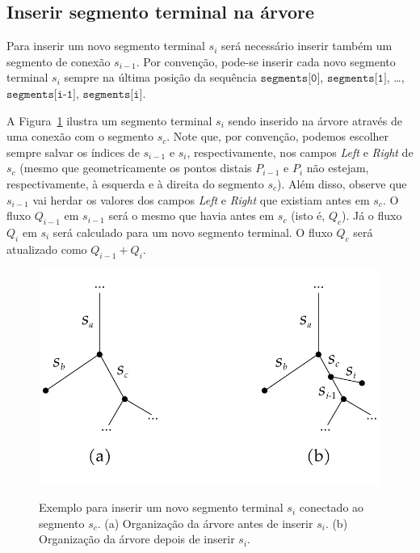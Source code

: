 \begin{apendices}
  \section{Inserir segmento terminal na árvore}\label{sec:inserir-segmento-terminal}

Para inserir um novo segmento terminal $s_{i}$ será necessário inserir também um segmento 
de conexão $s_{i-1}$. Por convenção, pode-se inserir cada novo segmento terminal $s_i$ 
sempre na última posição da sequência $\texttt{segments[0]}$, $\texttt{segments[1]}$, \ldots, $\texttt{segments[i-1]}$, $\texttt{segments[i]}$.

A Figura~\ref{fig:exemplo-inserir-segmento} ilustra 
um segmento terminal $s_{i}$ sendo inserido na árvore através
de uma conexão com o segmento $s_c$.
Note que, por convenção, podemos escolher sempre salvar os índices de $s_{i-1}$ e $s_{i}$,
respectivamente, nos campos \textit{Left} e \textit{Right} de $s_c$ (mesmo que geometricamente 
os pontos distais $P_{i-1}$ e $P_{i}$ não estejam, respectivamente, à esquerda e à direita 
do segmento $s_c$).
Além disso, observe que $s_{i-1}$ vai herdar os valores dos campos \textit{Left} e \textit{Right}
que existiam antes em $s_c$. O fluxo $Q_{i-1}$ em $s_{i-1}$ será o mesmo que havia antes em $s_c$ (isto é, 
$Q_{c}$). Já o fluxo $Q_i$ em $s_{i}$ será calculado para um novo segmento terminal.
O fluxo $Q_{c}$ será atualizado como $Q_{i-1} + Q_{i}$.

\begin{figure}[!htb]
  \centering
  \captiondelim{: }
  \caption{Exemplo para inserir um novo segmento terminal $s_{i}$ conectado ao segmento $s_c$.
  (a) Organização da árvore antes de inserir $s_{i}$.
  (b) Organização da árvore depois de inserir $s_{i}$.}
  \includegraphics[scale=0.75]{figuras/notas-sobre-implementacao/exemplo-inserir-novo-terminal.pdf}
  \label{fig:exemplo-inserir-segmento}
\end{figure}


\end{apendices}
